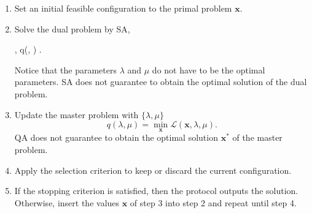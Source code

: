 \begin{enumerate}
    \item Set an initial feasible configuration to the primal problem $\mathbf{x}$.
    \item Solve the dual problem by SA,
\begin{maxi!}[2]
	{\lambda, \mu}{q(\lambda, \mu)}{}{}{}
	.
\end{maxi!}
Notice that the parameters $\lambda$ and $\mu$ do not have to be the optimal parameters. SA does not guarantee to obtain the optimal solution of the dual problem.
    \item Update the master problem with $\{\lambda, \mu\}$ 
    \begin{equation}
        q(\lambda,\mu) = \min_{\mathbf{x}} \mathcal{L}(\mathbf{x}, \lambda, \mu).
    \end{equation}
     QA does not guarantee to obtain the optimal solution $\mathbf{x}^{*}$ of the master problem.
    \item Apply the selection criterion to keep or discard the current configuration.
    \item If the stopping criterion is satisfied, then the protocol outputs the solution. Otherwise, insert the values $\mathbf{x}$ of step 3 into step 2 and repeat until step 4.
\end{enumerate}



